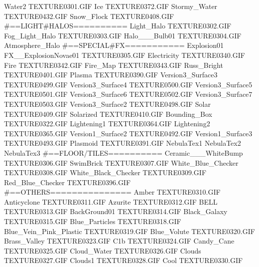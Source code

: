 Water2                         TEXTURE\TEX0301.GIF
Ice                            TEXTURE\TEX0372.GIF
Stormy_Water                   TEXTURE\TEX0432.GIF
Snow_Flock                     TEXTURE\TEX0408.GIF
#==LIGHT#HALOS==========
Light_Halo                     TEXTURE\TEX0302.GIF
Fog_Light_Halo                 TEXTURE\TEX0303.GIF
Halo___Bulb01                  TEXTURE\TEX0304.GIF
Atmosphere_Halo
#==SPECIAL#FX===========
Explosion01
FX__ExplosionNovae01           TEXTURE\TEX0305.GIF
Electricity                    TEXTURE\TEX0340.GIF
Fire                           TEXTURE\TEX0342.GIF
Fire_Map                       TEXTURE\TEX0343.GIF
Russ_Bright                    TEXTURE\TEX0401.GIF
Plasma                         TEXTURE\TEX0390.GIF
Version3_Surface3              TEXTURE\TEX0499.GIF
Version3_Surface4              TEXTURE\TEX0500.GIF
Version3_Surface5              TEXTURE\TEX0501.GIF
Version3_Surface6              TEXTURE\TEX0502.GIF
Version3_Surface7              TEXTURE\TEX0503.GIF
Version3_Surface2              TEXTURE\TEX0498.GIF
Solar                          TEXTURE\TEX0409.GIF
Solarized                      TEXTURE\TEX0410.GIF
Bounding_Box                   TEXTURE\TEX0322.GIF
Lightening1                    TEXTURE\TEX0364.GIF
Lightening2                    TEXTURE\TEX0365.GIF
Version1_Surface2              TEXTURE\TEX0492.GIF
Version1_Surface3              TEXTURE\TEX0493.GIF
Plasmoid                       TEXTURE\TEX0391.GIF
NebulaTex1
NebulaTex2
NebulaTex3
#==FLOOR/TILES==========
Ceramic___WhiteBump            TEXTURE\TEX0306.GIF
SwimBrick                      TEXTURE\TEX0307.GIF
White_Blue_Checker             TEXTURE\TEX0308.GIF
White_Black_Checker            TEXTURE\TEX0309.GIF
Red_Blue_Checker               TEXTURE\TEX0396.GIF
#==OTHERS===============
Amber                          TEXTURE\TEX0310.GIF
Anticyclone                    TEXTURE\TEX0311.GIF
Azurite                        TEXTURE\TEX0312.GIF
BELL                           TEXTURE\TEX0313.GIF
BackGround01                   TEXTURE\TEX0314.GIF
Black_Galaxy                   TEXTURE\TEX0315.GIF
Blue_Particles                 TEXTURE\TEX0318.GIF
Blue_Vein_Pink_Plastic         TEXTURE\TEX0319.GIF
Blue_Volute                    TEXTURE\TEX0320.GIF
Brass_Valley                   TEXTURE\TEX0323.GIF
C1b                            TEXTURE\TEX0324.GIF
Candy_Cane                     TEXTURE\TEX0325.GIF
Cloud_Water                    TEXTURE\TEX0326.GIF
Clouds                         TEXTURE\TEX0327.GIF
Clouds1                        TEXTURE\TEX0328.GIF
Cool                           TEXTURE\TEX0330.GIF
